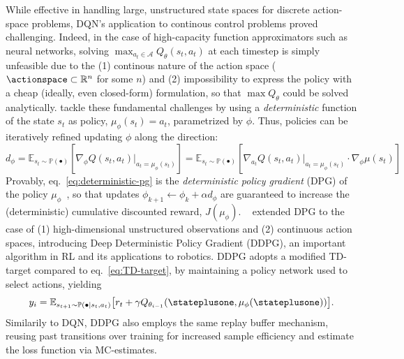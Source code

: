 While effective in handling large, unstructured state spaces for discrete action-space problems, DQN's application to continous control problems proved challenging.
Indeed, in the case of high-capacity function approximators such as neural networks, solving \( \max_{a_t \in \mathcal A} Q_\theta(s_t, a_t) \) at each timestep is simply unfeasible due to the (1) continous nature of the action space (\( \actionspace \subset \mathbb R^n \) for some \( n \)) and (2) impossibility to express the policy with a cheap (ideally, even closed-form) formulation, so that \( \max Q_\theta \) could be solved analytically.
\citet{silverDeterministicPolicyGradient2014} tackle these fundamental challenges by using a \emph{deterministic} function of the state \( s_t \) as policy, \( \mu_\phi(s_t) = a_t \), parametrized by \( \phi \). Thus, policies can be iteratively refined updating \( \phi \) along the direction:
\begin{equation}\label{eq:deterministic-pg}
    d_\phi = \mathbb E_{s_t \sim \mathbb P (\bullet)} \left[ \nabla_\phi Q(s_t, a_t)\vert_{a_t = \mu_\phi(s_t)} \right] = \mathbb E_{s_t \sim \mathbb P(\bullet)} \left[ \nabla_{a_t} Q(s_t, a_t) \vert_{a_t = \mu_\phi(s_t)} \cdot \nabla_\phi \mu(s_t) \right]
\end{equation}
Provably, eq.~\ref{eq:deterministic-pg} is the \emph{deterministic policy gradient} (DPG) of the policy \(\mu_\phi \)~\citep{silverDeterministicPolicyGradient2014}, so that updates \( \phi_{k+1}\leftarrow \phi_k + \alpha d_\phi \) are guaranteed to increase the (deterministic) cumulative discounted reward, \( J(\mu_\phi) \).
~\citet{lillicrapContinuousControlDeep2019} extended DPG to the case of (1) high-dimensional unstructured observations and (2) continuous action spaces, introducing Deep Deterministic Policy Gradient (DDPG), an important algorithm in RL and its applications to robotics.
DDPG adopts a modified TD-target compared to eq.~\ref{eq:TD-target}, by maintaining a policy network used to select actions, yielding
\begin{equation}\label{eq:TD-target-ddpg}
y_i = \mathbb E_{s_{t+1} \sim \mathbb P(\bullet \vert s_t, a_t)} \big[ r_t + \gamma Q_{\theta_{i-1}} (\stateplusone, \mu_\phi(\stateplusone)) \big] .
\end{equation}
Similarily to DQN, DDPG also employs the same replay buffer mechanism, reusing past transitions over training for increased sample efficiency and estimate the loss function via MC-estimates.

